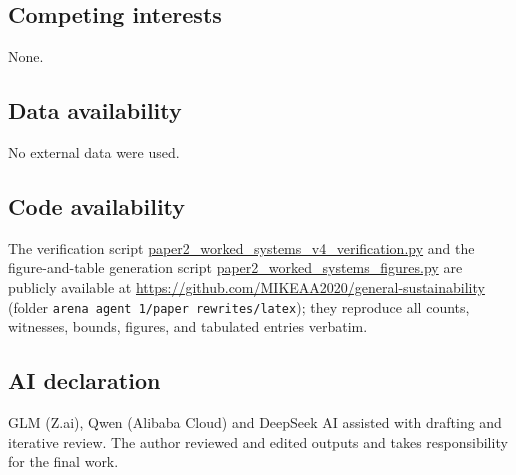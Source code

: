 \documentclass[10pt,twocolumn]{article}
\theoremstyle{definition}
\begin{document}
\subsection*{Competing interests}
None.

\subsection*{Data availability}
No external data were used.

\subsection*{Code availability}
The verification script \url{paper2_worked_systems_v4_verification.py}
and the figure-and-table generation script
\url{paper2_worked_systems_figures.py} are publicly available at
\url{https://github.com/MIKEAA2020/general-sustainability} (folder
\texttt{arena agent 1/paper rewrites/latex}); they reproduce all
counts, witnesses, bounds, figures, and tabulated entries verbatim.

\subsection*{AI declaration}
GLM (Z.ai), Qwen (Alibaba Cloud) and DeepSeek AI assisted with drafting
and iterative review. The author reviewed and edited outputs and takes
responsibility for the final work.
\end{document}
